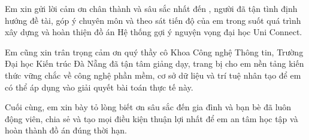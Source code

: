 \begin{acknowledgments}

Em xin gửi lời cảm ơn chân thành và sâu sắc nhất đến \dauGVHD, người đã tận tình định hướng đề tài, góp ý chuyên môn và theo sát tiến độ của em trong suốt quá trình xây dựng và hoàn thiện đồ án Hệ thống gợi ý nguyện vọng đại học Uni Connect.

Em cũng xin trân trọng cảm ơn quý thầy cô Khoa Công nghệ Thông tin, Trường Đại học Kiến trúc Đà Nẵng đã tận tâm giảng dạy, trang bị cho em nền tảng kiến thức vững chắc về công nghệ phần mềm, cơ sở dữ liệu và trí tuệ nhân tạo để em có thể áp dụng vào giải quyết bài toán thực tế này.

Cuối cùng, em xin bày tỏ lòng biết ơn sâu sắc đến gia đình và bạn bè đã luôn động viên, chia sẻ và tạo mọi điều kiện thuận lợi nhất để em an tâm học tập và hoàn thành đồ án đúng thời hạn.

\vspace{1.4em}
\hfill{}

\end{acknowledgments}
